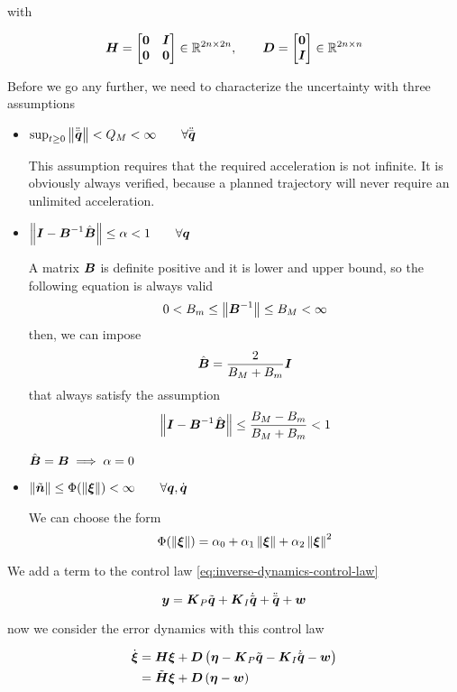 with

\[
	\boldsymbol{H} = \begin{bmatrix}\boldsymbol{0}&\boldsymbol{I}\\\boldsymbol{0}&\boldsymbol{0}\end{bmatrix} \in \mathbb{R}^{2n \times 2n}, \qquad
	\boldsymbol{D} = \begin{bmatrix}\boldsymbol{0}\\\boldsymbol{I}\end{bmatrix} \in \mathbb{R}^{2n \times n}
\]

Before we go any further, we need to characterize the uncertainty with three assumptions

\begin{itemize}
	\item $\sup_{t\ge0}\left\lVert\ddot{\bar{\boldsymbol{q}}}\right\rVert < Q_M < \infty \qquad \forall \ddot{\bar{\boldsymbol{q}}}$

	This assumption requires that the required acceleration is not infinite.
	It is obviously always verified, because a planned trajectory will never require an unlimited acceleration.

	\item $\left\lVert\boldsymbol{I} - \boldsymbol{B}^{-1} \hat{\boldsymbol{B}}\right\rVert \le \alpha < 1 \qquad \forall \boldsymbol{q}$

	A matrix $\boldsymbol{B}$ is definite positive and it is lower and upper bound, so the following equation is always valid
	\[ 0 < B_m \le \left\lVert\boldsymbol{B}^{-1}\right\rVert \le B_M < \infty \]
	then, we can impose
 	\[ \hat{\boldsymbol{B}} = \frac{2}{B_M+B_m}\boldsymbol{I} \]
	that always satisfy the assumption
	\[ \left\lVert\boldsymbol{I} - \boldsymbol{B}^{-1} \hat{\boldsymbol{B}}\right\rVert \le \frac{B_M-B_m}{B_M+B_m} < 1 \]
	\begin{nb}$\hat{\boldsymbol{B}} = \boldsymbol{B} \implies \alpha = 0$\end{nb}

	\item $\left\lVert\tilde{\boldsymbol{n}}\right\rVert \le \Phi(\left\lVert\boldsymbol{\xi}\right\rVert) < \infty \qquad \forall \boldsymbol{q},\dot{\boldsymbol{q}}$

	We can choose the form
	\[ \Phi(\left\lVert\boldsymbol{\xi}\right\rVert) = \alpha_0 + \alpha_1 \left\lVert\boldsymbol{\xi}\right\rVert + \alpha_2 \left\lVert\boldsymbol{\xi}\right\rVert^2 \]
\end{itemize}

We add a term to the control law \autoref{eq:inverse-dynamics-control-law}

\[
	\boldsymbol{y} = \boldsymbol{K}_P \tilde{\boldsymbol{q}} + \boldsymbol{K}_I \dot{\tilde{\boldsymbol{q}}} + \ddot{\bar{\boldsymbol{q}}} + \boldsymbol{w}
\]

now we consider the error dynamics with this control law

\begin{align*}
    \dot{\boldsymbol{\xi}} &= \boldsymbol{H} \boldsymbol{\xi} + \boldsymbol{D} \left(\boldsymbol{\eta} - \boldsymbol{K}_P \tilde{\boldsymbol{q}} - \boldsymbol{K}_I \dot{\tilde{\boldsymbol{q}}} - \boldsymbol{w}  \right) \\
	&= \tilde{\boldsymbol{H}} \boldsymbol{\xi} + \boldsymbol{D} \left(\boldsymbol{\eta} - \boldsymbol{w} \right)
\end{align*}

